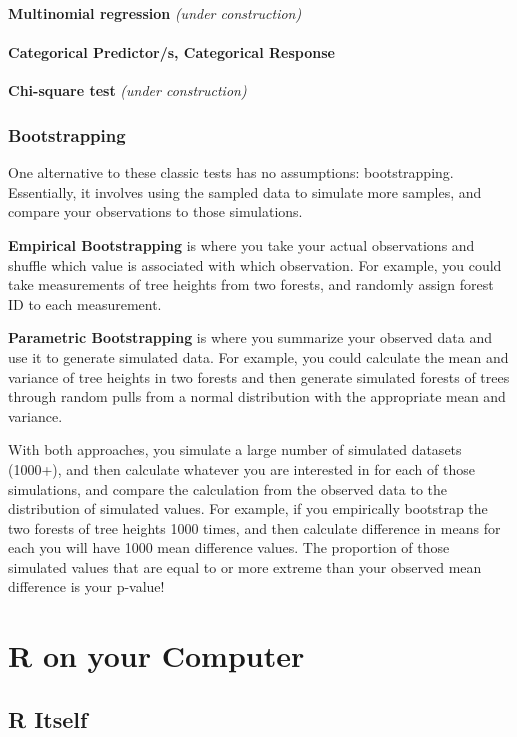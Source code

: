 \documentclass[
  letterpaper,
  DIV=11,
  numbers=noendperiod]{scrreprt}
\begin{document}
\textbf{Multinomial regression} \emph{(under construction)}

\subsection{Categorical Predictor/s, Categorical
Response}\label{categorical-predictors-categorical-response}

\textbf{Chi-square test} \emph{(under construction)}

\section{Bootstrapping}\label{bootstrapping}

One alternative to these classic tests has no assumptions:
bootstrapping. Essentially, it involves using the sampled data to
simulate more samples, and compare your observations to those
simulations.

\textbf{Empirical Bootstrapping} is where you take your actual
observations and shuffle which value is associated with which
observation. For example, you could take measurements of tree heights
from two forests, and randomly assign forest ID to each measurement.

\textbf{Parametric Bootstrapping} is where you summarize your observed
data and use it to generate simulated data. For example, you could
calculate the mean and variance of tree heights in two forests and then
generate simulated forests of trees through random pulls from a normal
distribution with the appropriate mean and variance.

With both approaches, you simulate a large number of simulated datasets
(1000+), and then calculate whatever you are interested in for each of
those simulations, and compare the calculation from the observed data to
the distribution of simulated values. For example, if you empirically
bootstrap the two forests of tree heights 1000 times, and then calculate
difference in means for each you will have 1000 mean difference values.
The proportion of those simulated values that are equal to or more
extreme than your observed mean difference is your p-value!

\part{R on your Computer}

\chapter{R Itself}\label{r-itself}
\end{document}
